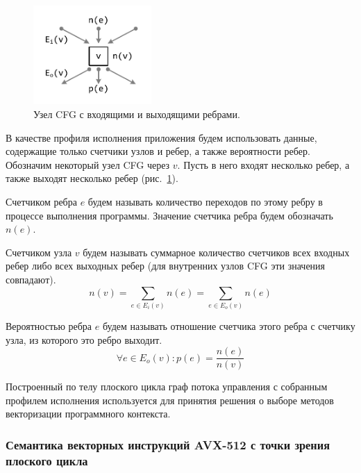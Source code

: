 \begin{figure}[ht]
\centering
\includegraphics[width=0.4\textwidth]{./fig/vec_cfg.pdf}
\singlespacing
{}\caption{Узел CFG с входящими и выходящими ребрами.}
\label{fig:text_4_vec_flat_cfg}
\end{figure}

В качестве профиля исполнения приложения будем использовать данные, содержащие только счетчики узлов и ребер, а также вероятности ребер.
Обозначим некоторый узел CFG через $v$.
Пусть в него входят несколько ребер, а также выходят несколько ребер (рис.~\ref{fig:text_4_vec_flat_cfg}).

\begin{definition}
Счетчиком ребра $e$ будем называть количество переходов по этому ребру в процессе выполнения программы.
Значение счетчика ребра будем обозначать $n(e)$.
\end{definition}

\begin{definition}
Счетчиком узла $v$ будем называть суммарное количество счетчиков всех входных ребер либо всех выходных ребер (для внутренних узлов CFG эти значения совпадают).
\begin{equation}
	n(v) = \sum_{e \in E_i(v)}{n(e)} = \sum_{e \in E_o(v)}{n(e)}
\end{equation}
\end{definition}

\begin{definition}
Вероятностью ребра $e$ будем называть отношение счетчика этого ребра с счетчику узла, из которого это ребро выходит.
\begin{equation}
	\forall e \in E_o(v): p(e) = \frac{n(e)}{n(v)}
\end{equation}
\end{definition}

Построенный по телу плоского цикла граф потока управления с собранным профилем исполнения используется для принятия решения о выборе методов векторизации программного контекста.

\subsubsection{Семантика векторных инструкций AVX-512 с точки зрения плоского цикла}

